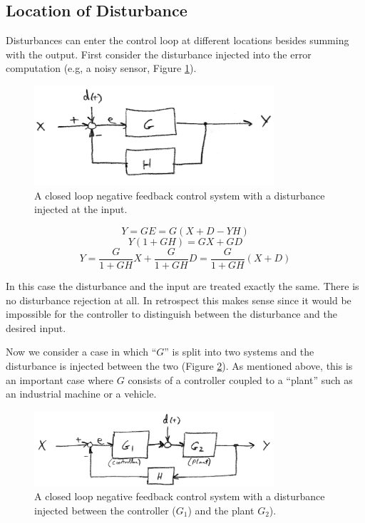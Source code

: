 \subsection{Location of Disturbance}

Disturbances can enter the control loop at different locations besides summing with the output.  First consider the disturbance injected into the error computation (e.g, a noisy sensor, Figure \ref{disturbanceaterror}).


\begin{figure}\centering
\includegraphics[width=3.5in]{figs06/00776a.png}
\caption{A closed loop negative feedback control system with a disturbance injected at the input.}\label{disturbanceaterror}
\end{figure}

\[
Y = GE = G(X+D-YH)
\]
\[
Y(1+GH) = GX + GD
\]
\[
Y = \frac{G}{1+GH}X  + \frac{G}{1+GH}D = \frac{G}{1+GH}(X+D)
\]

In this case the disturbance and the input are treated exactly the same. There is no disturbance rejection at all.  In retrospect this makes sense since it would be impossible for the controller to distinguish between the disturbance and the desired input.

Now we consider a case in which ``$G$'' is split into two systems and the disturbance is injected between the two (Figure \ref{disturbancebetweenCP}).  As mentioned above,  this is an important case where $G$ consists of a controller coupled to a ``plant'' such as an industrial machine or a vehicle.


\begin{figure}\centering
\includegraphics[width=3.5in]{figs06/00777a.png}
\caption{A closed loop negative feedback control system with a disturbance injected between the controller ($G_1$) and the plant $G_2$).}\label{disturbancebetweenCP}
\end{figure}


